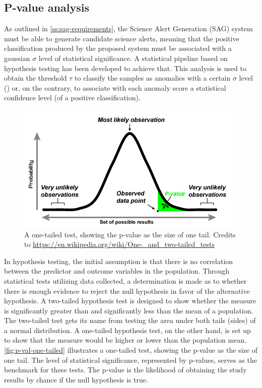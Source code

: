 \subsection{P-value analysis}
\label{ss:p-values}
As outlined in \autoref{ss:sag-requirements}, the Science Alert Generation (SAG) system must be able to generate candidate science alerts, meaning that the positive classification produced by the proposed system must be associated with a gaussian $\sigma$ level of statistical significance. A statistical pipeline based on hypothesis testing has been developed to achieve that. This analysis is used to obtain the threshold $\tau$ to classify the samples as anomalies with a certain $\sigma$ level (\cite{Parmiggiani_2021}) or, on the contrary, to associate with each anomaly score a statistical confidence level (of a positive classification). 
\begin{figure}[t]
\centering
\includegraphics[width=0.6\linewidth]{figures/method/pvalue.png}
\caption{A one-tailed test, showing the p-value as the size of one tail. Credits to \url{https://en.wikipedia.org/wiki/One-_and_two-tailed_tests}}
\label{fig:p-val-one-tailed}
\end{figure}
In hypothesis testing, the initial assumption is that there is no correlation between the predictor and outcome variables in the population. Through statistical tests utilizing data collected, a determination is made as to whether there is enough evidence to reject the null hypothesis in favor of the alternative hypothesis. A two-tailed hypothesis test is designed to show whether the measure is significantly greater than and significantly less than the mean of a population. The two-tailed test gets its name from testing the area under both tails (sides) of a normal distribution. A one-tailed hypothesis test, on the other hand, is set up to show that the measure would be higher or lower than the population mean. \autoref{fig:p-val-one-tailed} illustrates a one-tailed test, showing the p-value as the size of one tail. The level of statistical significance, represented by p-values, serves as the benchmark for these tests. The p-value is the likelihood of obtaining the study results by chance if the null hypothesis is true.
